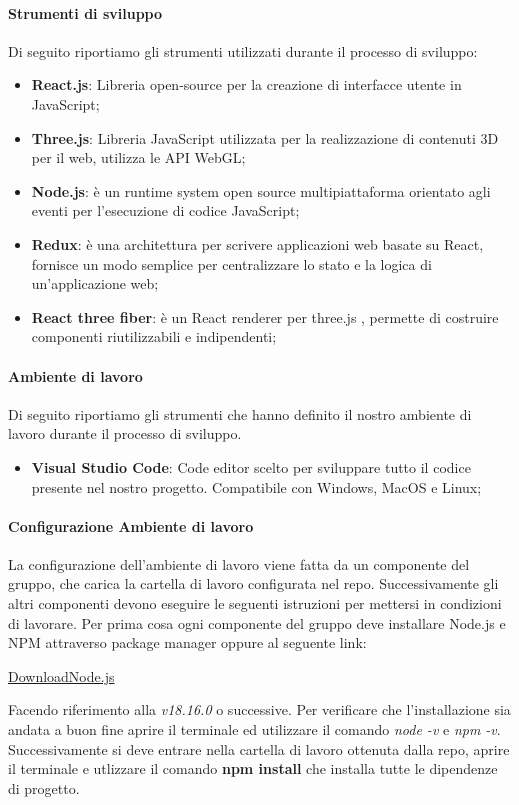 	\paragraph{Strumenti di sviluppo}
	Di seguito riportiamo gli strumenti utilizzati durante il processo di sviluppo:
		\begin{itemize}
			\item \textbf{React.js}: Libreria open-source per la creazione di interfacce utente in JavaScript;
			\item \textbf{Three.js}: Libreria JavaScript utilizzata per la realizzazione di contenuti 3D per il web, utilizza le API WebGL;
			\item \textbf{Node.js}: è un runtime system open source multipiattaforma orientato agli eventi per l'esecuzione di codice JavaScript;
			\item \textbf{Redux}: è una architettura per scrivere applicazioni web basate su 					React,  fornisce un modo semplice per centralizzare lo stato e la logica di 		un'applicazione web;
			\item \textbf{React three fiber}: è un React renderer per three.js , permette di costruire componenti riutilizzabili e indipendenti;
		\end{itemize}
		
	\paragraph{Ambiente di lavoro}
		Di seguito riportiamo gli strumenti che hanno definito il nostro ambiente di lavoro durante il processo di sviluppo.
		\begin{itemize}
			\item \textbf{Visual Studio Code}: Code editor scelto per sviluppare tutto il codice presente nel nostro progetto. Compatibile con Windows, MacOS e Linux;
		\end{itemize}
		
	\paragraph{Configurazione Ambiente di lavoro}
	La configurazione dell'ambiente di lavoro viene fatta da un componente del gruppo, che carica la cartella di lavoro configurata nel repo.  Successivamente gli altri componenti devono eseguire le seguenti istruzioni per mettersi in condizioni di lavorare.
	Per prima cosa ogni componente del gruppo deve installare Node.js e NPM attraverso package manager oppure al seguente link: 
	\begin{center}
\href{https://nodejs.org/en/download}{DownloadNode.js}
\end{center}
Facendo riferimento alla \textit{v18.16.0} o successive.  Per verificare che l'installazione sia andata a buon fine aprire il terminale ed utilizzare il comando \textit{node -v} e \textit{npm -v}. \\
Successivamente si deve entrare nella cartella di lavoro ottenuta dalla repo, aprire il terminale e utlizzare il comando \textbf{npm install} che installa tutte le dipendenze di progetto.


	 
	
	
	
	
	
			